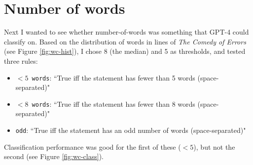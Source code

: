 \documentclass[a4paper, 11pt]{article}
\begin{document}
\section{Number of words}
Next I wanted to see whether number-of-words was something that GPT-4 could classify on.
Based on the distribution of words in lines of \emph{The Comedy of Errors} (see Figure \ref{fig:wc-hist}), I chose 8 (the median) and 5 as thresholds, and tested three rules:

\begin{itemize}
	\item \texttt{$<5$ words}: ``True iff the statement has fewer than 5 words (space-separated)"
   \item  \texttt{$<8$ words}: ``True iff the statement has fewer than 8 words (space-separated)"
   \item  \texttt{odd}: ``True iff the statement has an odd number of words (space-separated)"
\end{itemize}

Classification performance was good for the first of these ($<5$), but not the second (see Figure \ref{fig:wc-class}).
\end{document}
